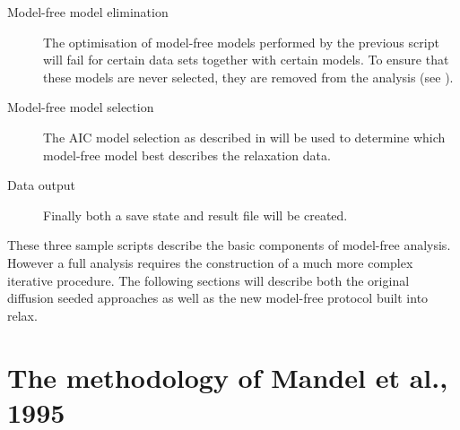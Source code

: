 \begin{htmlonly}
\begin{htmlonly}
\begin{description}
\item[Model-free model elimination]  The optimisation of model-free models performed by the previous script will fail for certain data sets together with certain models.  To ensure that these models are never selected, they are removed from the analysis (see \citet{dAuvergneGooley06}).
\item[Model-free model selection]  The AIC model selection as described in \citet{dAuvergneGooley03} will be used to determine which model-free model best describes the relaxation data.
\item[Data output]  Finally both a save state and result file will be created.
\end{description}

These three sample scripts describe the basic components of model-free analysis.  However a full analysis requires the construction of a much more complex iterative procedure.  The following sections will describe both the original diffusion seeded approaches as well as the new model-free protocol built into relax.



\section{The methodology of Mandel et al., 1995}
\label{sect: Mandel 1995}


\end{htmlonly}
\end{htmlonly}
